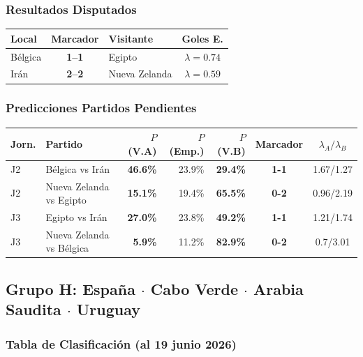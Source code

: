 \documentclass[11pt,a4paper]{article}
\newcommand{\prob}[1]{\textbf{#1\%}}
\begin{document}
\subsubsection*{Resultados Disputados}

\begin{center}
\begin{tabular}{@{}lclc@{}}
\toprule
\textbf{Local} & \textbf{Marcador} & \textbf{Visitante} & \textbf{Goles E.} \\
\midrule
  Bélgica & \textbf{1--1} & Egipto & $\lambda=0.74$ \\
  Irán & \textbf{2--2} & Nueva Zelanda & $\lambda=0.59$ \\
\bottomrule
\end{tabular}
\end{center}

\subsubsection*{Predicciones Partidos Pendientes}


\begin{center}
\begin{tabular}{@{}llrrrcc@{}}
\toprule
\textbf{Jorn.} & \textbf{Partido} & \textbf{$P$(V.A)} & \textbf{$P$(Emp.)} & \textbf{$P$(V.B)} & \textbf{Marcador} & \textbf{$\lambda_A/\lambda_B$} \\
\midrule
  J2 & Bélgica vs Irán & \cellcolor{yellow!30}\prob{46.6} & 23.9\% & \cellcolor{red!15}\prob{29.4} & \textbf{1-1} & 1.67/1.27 \\
  J2 & Nueva Zelanda vs Egipto & \cellcolor{red!15}\prob{15.1} & 19.4\% & \cellcolor{green!20}\prob{65.5} & \textbf{0-2} & 0.96/2.19 \\
  J3 & Egipto vs Irán & \cellcolor{red!15}\prob{27.0} & 23.8\% & \cellcolor{yellow!30}\prob{49.2} & \textbf{1-1} & 1.21/1.74 \\
  J3 & Nueva Zelanda vs Bélgica & \cellcolor{red!15}\prob{5.9} & 11.2\% & \cellcolor{green!20}\prob{82.9} & \textbf{0-2} & 0.7/3.01 \\
\bottomrule
\end{tabular}
\end{center}


\subsection{Grupo H: España $\cdot$ Cabo Verde $\cdot$ Arabia Saudita $\cdot$ Uruguay}

\subsubsection*{Tabla de Clasificación (al 19 junio 2026)}
\end{document}
